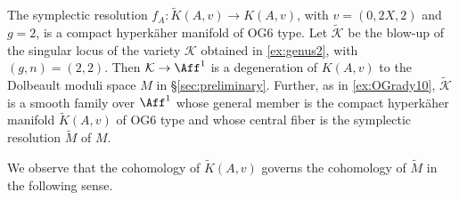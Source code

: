 \begin{exa}
The symplectic resolution $f_A \colon \widetilde{K}(A,v) \to K(A,v)$, with $v=(0,2X,2)$ and $g=2$, is a compact hyperkäher manifold of OG6 type. Let $\widetilde{\mathcal{K}}$ be the blow-up of the singular locus of the variety $\mathcal{K}$ obtained in \cref{ex:genus2}, with $(g,n)=(2,2)$. Then $\mathcal{K} \to \Aff^1$ is a degeneration of $K(A,v)$ to the Dolbeault moduli space $M$ in \S \ref{sec:preliminary}. Further, as in \cref{ex:OGrady10}, $\widetilde{\mathcal{K}}$ is a smooth family over $\Aff^1$ whose general member is the compact hyperkäher manifold $\widetilde{K}(A,v)$ of OG6 type and whose central fiber is the symplectic resolution $\widetilde{M}$ of $M$.

We observe that the cohomology of $\widetilde{K}(A,v)$ governs the cohomology of $\widetilde{M}$ in the following sense.


\end{exa}
